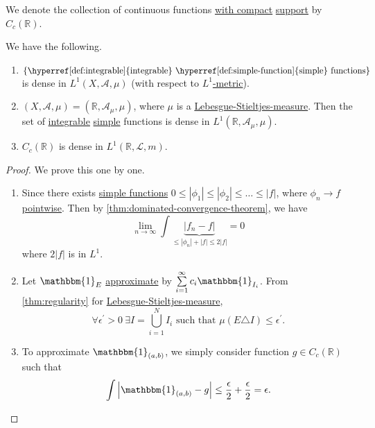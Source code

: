 \begin{notation}
	We denote the collection of continuous functions \underline{with compact} \hyperref[def:support]{support}
	by \(C_c(\mathbb{R} )\).
\end{notation}

\begin{theorem}
	We have the following.
	\begin{enumerate}[(1)]
		\item \(\{\text{\hyperref[def:integrable]{integrable} \hyperref[def:simple-function]{simple} functions} \}\) is dense
		      in \(L^1(X, \mathcal{A} , \mu )\) (with respect to \hyperref[def:L-1-metric]{\(L^1\)-metric}).
		\item \((X, \mathcal{A} , \mu ) = (\mathbb{R} , \mathcal{A} _\mu , \mu )\),
		      where \(\mu\) is a \hyperref[def:Lebesgue-Stieltjes-measure]{Lebesgue-Stieltjes-measure}. Then
		      the set of \hyperref[def:integrable]{integrable} \hyperref[def:simple-function]{simple} functions
		      is dense in \(L^1(\mathbb{R} , \mathcal{A} _\mu , \mu )\).
		\item \(C_c(\mathbb{R} )\) is dense in \(L^1(\mathbb{R} , \hyperref[def:Lebesgue-measure]{\mathcal{L} , m})\).
	\end{enumerate}
\end{theorem}
\begin{proof}
	We prove this one by one.
	\begin{enumerate}[(1)]
		\item Since there exists \hyperref[def:simple-function]{simple functions} \(0\leq \left\vert \phi _1 \right\vert \leq \left\vert \phi _2 \right\vert\leq \dots \leq \left\vert f \right\vert  \),
		      where \(\phi _{n}\to f\) \hyperref[def:pointwise-convergence]{pointwise}. Then by \autoref{thm:dominated-convergence-theorem}, we have
		      \[
			      \lim\limits_{n \to \infty} \int \underbrace{\left\vert f_{n} - f\right\vert }_{\leq \left\vert \phi _{n} \right\vert + \left\vert f  \right\vert\leq 2\left\vert f \right\vert } = 0
		      \]
		      where \(2\left\vert f \right\vert \) is in \(L^1\).
		\item Let \(\mathbbm{1}_{E} \) \underline{approximate} by \(\sum\limits_{i=1}^{\infty} c_{i}\mathbbm{1}_{I_{i}} \). From \autoref{thm:regularity} for
		      \hyperref[def:Lebesgue-Stieltjes-measure]{Lebesgue-Stieltjes-measure},
		      \[
			      \forall \epsilon ^\prime >0\ \exists I = \bigcup\limits_{i=1}^{N} I_{i}\text{ such that } \mu (E\triangle I)\leq \epsilon ^\prime .
		      \]
		\item To approximate \(\mathbbm{1}_{(a, b)} \), we simply consider function \(g\in C_c(\mathbb{R} )\) such that
		      \[
			      \int \left\vert \mathbbm{1}_{(a, b)} - g \right\vert \leq \frac{\epsilon}{2} + \frac{\epsilon}{2} = \epsilon .
		      \]
	\end{enumerate}
\end{proof}